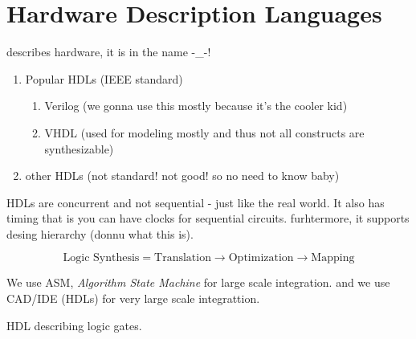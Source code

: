 \section{Hardware Description Languages}
describes hardware, it is in the name -\_-!
\begin{enumerate}
    \item Popular HDLs (IEEE standard)
          \begin{enumerate}
              \item Verilog (we gonna use this mostly because it's the cooler kid)
              \item VHDL (used for modeling mostly and thus not all constructs are synthesizable)
          \end{enumerate}
    \item other HDLs (not standard! not good! so no need to know baby)
\end{enumerate}

HDLs are concurrent and not sequential - just like the real world. It also has timing that is you can have clocks for sequential circuits. furhtermore, it supports desing hierarchy (donnu what this is).

\begin{equation*}
    \text{Logic Synthesis} = \text{Translation} \to \text{Optimization} \to \text{Mapping}
\end{equation*}

We use ASM, \textit{Algorithm State Machine} for large scale integration. and we use CAD/IDE (HDLs) for very large scale integrattion.

\begin{definition}[Netlist]
    HDL describing logic gates.
\end{definition}

